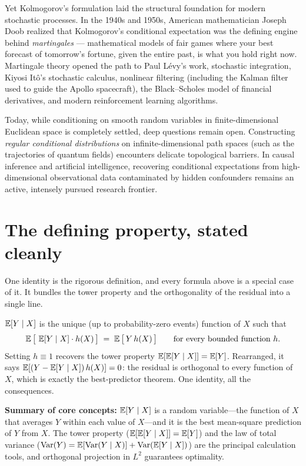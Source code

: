 \begin{historybox}
Yet Kolmogorov's formulation laid the structural foundation for modern stochastic processes. In the 1940s and 1950s,
American mathematician Joseph Doob realized that Kolmogorov's conditional expectation was the defining engine behind
\emph{martingales} --- mathematical models of fair games where your best forecast of tomorrow's fortune, given the
entire past, is what you hold right now. Martingale theory opened the path to Paul L\'evy's work,
stochastic integration, Kiyosi It\^o's stochastic calculus, nonlinear filtering (including the Kalman filter used
to guide the Apollo spacecraft), the Black--Scholes model of financial derivatives, and modern reinforcement
learning algorithms.

Today, while conditioning on smooth random variables in finite-dimensional Euclidean space is completely settled,
deep questions remain open. Constructing \emph{regular conditional distributions} on infinite-dimensional
path spaces (such as the trajectories of quantum fields) encounters delicate topological barriers. In causal
inference and artificial intelligence, recovering conditional expectations from high-dimensional observational
data contaminated by hidden confounders remains an active, intensely pursued research frontier.
\end{historybox}

\section{The defining property, stated cleanly}
\label{ch15:defining-property}

One identity is the rigorous definition, and every formula above is a special
case of it. It bundles the tower property and the orthogonality of the residual into a single line.

\begin{formalbox}
$\operatorname{\mathbb{E}}[Y\mid X]$ is the unique (up to probability-zero events) function of $X$ such that
\[
  \operatorname{\mathbb{E}}\big[\,\operatorname{\mathbb{E}}[Y\mid X]\cdot h(X)\,\big] \;=\; \operatorname{\mathbb{E}}\big[\,Y\, h(X)\,\big]
  \qquad \text{for every bounded function } h.
\]
Setting $h \equiv 1$ recovers the tower property $\operatorname{\mathbb{E}}[\operatorname{\mathbb{E}}[Y\mid X]] = \operatorname{\mathbb{E}}[Y]$. Rearranged, it says
$\operatorname{\mathbb{E}}[(Y - \operatorname{\mathbb{E}}[Y\mid X])\,h(X)] = 0$: the residual is orthogonal to every function of $X$, which is
exactly the best-predictor theorem. One identity, all the consequences.
\end{formalbox}

\begin{recoverybox}
\textbf{Summary of core concepts:} $\operatorname{\mathbb{E}}[Y\mid X]$ is a random variable---the function of $X$ that averages $Y$ within each value of $X$---and it is the best mean-square prediction of $Y$ from $X$. The tower property ($\operatorname{\mathbb{E}}[\operatorname{\mathbb{E}}[Y\mid X]] = \operatorname{\mathbb{E}}[Y]$) and the law of total variance ($\operatorname{Var}(Y) = \operatorname{\mathbb{E}}[\operatorname{Var}(Y\mid X)] + \operatorname{Var}(\operatorname{\mathbb{E}}[Y\mid X])$) are the principal calculation tools, and orthogonal projection in $L^2$ guarantees optimality.
\end{recoverybox}


